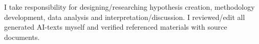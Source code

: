 \documentclass[
11pt, %
english, %
onehalfspacing, %
headsepline, %
]{MastersDoctoralThesis} %
\begin{document}
I take responsibility for designing/researching hypothesis creation, methodology development, data analysis and interpretation/discussion. I reviewed/edit all generated AI-texts myself and verified referenced materials with source documents.

\tableofcontents


\mainmatter %

\pagestyle{thesis} %











\printbibliography[heading=bibintoc]


\appendix %




%

\end{document}
